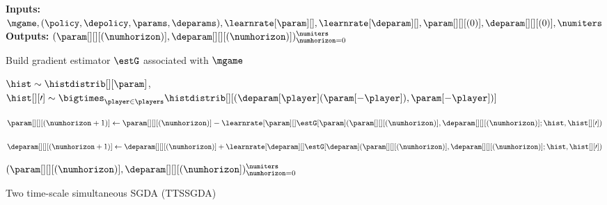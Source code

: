\begin{wrapfigure}{L}{0.55\textwidth}
    \begin{minipage}{0.55\textwidth}
    \begin{algorithm}[H]
    \caption{Two time-scale 
    simultaneous 
    SGDA (TTSSGDA)}
    \textbf{Inputs:} $\mgame, (\policy, \depolicy, \params, \deparams), \learnrate[\param][ ], \learnrate[\deparam][ ],  \param[][][(0)], \deparam[][][(0)], \numiters$ \\
    \textbf{Outputs:} $(\param[][][(\numhorizon)], \deparam[][][(\numhorizon)])_{\numhorizon = 0}^\numiters$
    \label{alg:two_time_sgda}
    \begin{algorithmic}[1]
    
    \State Build gradient estimator $\estG$ associated with $\mgame$ 
    
            
            \State 
            $\hist \sim \histdistrib[][\param]$, $\hist[][\prime] \sim \bigtimes_{\player \in \players} \histdistrib[][{(\deparam[\player] (\param[-\player]), \param[-\player])}]$ 
            
            \State  $\param[][][(\numhorizon + 1)] \gets 
            \param[][][(\numhorizon)] - \learnrate[\param][ ]  \estG[\param] (\param[][][(\numhorizon)], \deparam[][][(\numhorizon)]; \hist, \hist[][\prime]) $
        
            \State  $\deparam[][][(\numhorizon + 1)]  \gets  
            \deparam[][][(\numhorizon)] + \learnrate[\deparam][ ] \estG[\deparam] (\param[][][(\numhorizon)], \deparam[][][(\numhorizon)]; \hist, \hist[][\prime]) $
    
            
    \EndFor
    \State \Return $(\param[][][(\numhorizon)], \deparam[][][(\numhorizon])_{\numhorizon = 0}^\numiters$
    \end{algorithmic}
    \end{algorithm}
    \end{minipage}
\end{wrapfigure}
